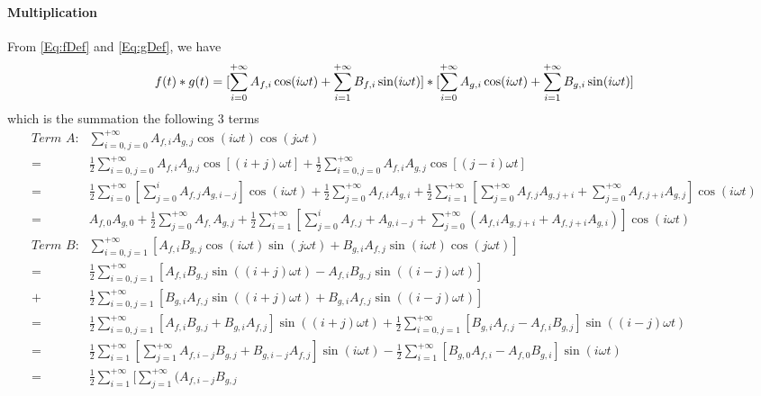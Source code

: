 \documentclass[12pt]{article}
\begin{document}
\paragraph{Multiplication}\label{App-Para:Multiplication}
From \autoref{Eq:fDef} and \autoref{Eq:gDef}, we have
\begin{equation}
f(t)*g(t)=[\sum_{i=0}^{+\infty}A_{f, i}\cos(i\omega t)
+\sum_{i=1}^{+\infty}B_{f, i}\sin(i\omega t)]
*[\sum_{i=0}^{+\infty}A_{g, i}\cos(i\omega t)
+\sum_{i=1}^{+\infty}B_{g, i}\sin(i\omega t)]\\
\end{equation}
which is the summation the following 3 terms
\begin{equation}
\begin{aligned}
\textit{Term A:} &\sum_{i=0, j=0}^{+\infty}A_{f,i}A_{g,j}
\cos(i\omega t)\cos(j\omega t)\\
=&\frac{1}{2}\sum_{i=0, j=0}^{+\infty}A_{f, i}A_{g, j}\cos[(i+j)\omega t] 
+ \frac{1}{2}\sum_{i=0, j=0}^{+\infty}A_{f, i}A_{g, j}\cos[(j-i)\omega t]\\
=&\frac{1}{2}\sum_{i=0}^{+\infty}[\sum_{j=0}^{i}A_{f,j}A_{g,i-j}]
\cos(i\omega t)+\frac{1}{2}\sum_{j=0}^{+\infty}A_{f,i}A_{g,i}
+\frac{1}{2}\sum_{i=1}^{+\infty}[\sum_{j=0}^{+\infty}A_{f, j}A_{g, j+i}
+\sum_{j=0}^{+\infty}A_{f, j+i}A_{g, j}]\cos(i\omega t)\\
=&A_{f,0}A_{g,0}+\frac{1}{2}\sum_{j=0}^{+\infty}A_{f,}A_{g,j}+\frac{1}{2}
\sum_{i=1}^{+\infty}[\sum_{j=0}^{i}A_{f,j}+A_{g,i-j}+\sum_{j=0}^{+\infty}
(A_{f,i}A_{g,j+i}+A_{f,j+i}A_{g,i})]\cos(i\omega t)\\
\textit{Term B:} &\sum_{i=0,j=1}^{+\infty}[A_{f,i}B_{g,j}\cos(i\omega t)
\sin(j\omega t)+B_{g,i}A_{f,j}\sin(i\omega t)\cos(j\omega t)]\\
=&\frac{1}{2}\sum_{i=0,j=1}^{+\infty}[A_{f,i}B_{g,j}\sin((i+j)\omega t)
-A_{f,i}B_{g,j}\sin((i-j)\omega t)]\\+&\frac{1}{2}
\sum_{i=0,j=1}^{+\infty}[B_{g,i}A_{f,j}\sin((i+j)\omega t)+B_{g,i}A_{f,j}
\sin((i-j)\omega t)]\\
=&\frac{1}{2}\sum_{i=0,j=1}^{+\infty}[A_{f,i}B_{g,j}+B_{g,i}A_{f,j}]
\sin((i+j)\omega t)+\frac{1}{2}\sum_{i=0,j=1}^{+\infty}
[B_{g,i}A_{f,j}-A_{f,i}B_{g,j}]\sin((i-j)\omega t)\\
=&\frac{1}{2}\sum_{i=1}^{+\infty}[\sum_{j=1}^{+\infty}
A_{f,i-j}B_{g,j}+B_{g,i-j}A_{f,j}]\sin(i\omega t)
-\frac{1}{2}\sum_{i=1}^{+\infty}[B_{g,0}A_{f,i}-A_{f,0}B_{g,i}]
\sin(i\omega t)\\
=&\frac{1}{2}\sum_{i=1}^{+\infty}[\sum_{j=1}^{+\infty}(A_{f,i-j}B_{g,j}

\end{aligned}
\end{equation}
\end{document}

